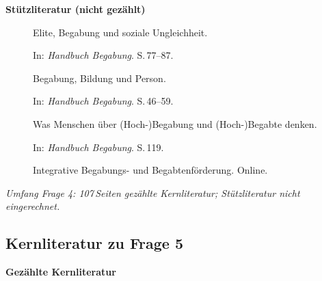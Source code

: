 \textbf{Stützliteratur (nicht gezählt)}

\begin{description}
  \item[\cite{horvath2021elite}] Elite, Begabung und soziale Ungleichheit.
    
    In: \textit{Handbuch Begabung}.
    S.\,77--87.

  \item[\cite{weigand2021person}] Begabung, Bildung und Person.
    
    In: \textit{Handbuch Begabung}.
    S.\,46--59.

  \item[\cite{baudson2021wasdenken}] Was Menschen über (Hoch-)Begabung und (Hoch-)Begabte denken.
    
    In: \textit{Handbuch Begabung}.
    S.\,119.

  \item[\cite{dvs2025bbf}] Integrative Begabungs- und Begabtenförderung.
    Online.

\end{description}

\textit{Umfang Frage 4: 107\,Seiten gezählte Kernliteratur; Stützliteratur nicht eingerechnet.}


\subsection{Kernliteratur zu Frage 5}

\textbf{Gezählte Kernliteratur}

